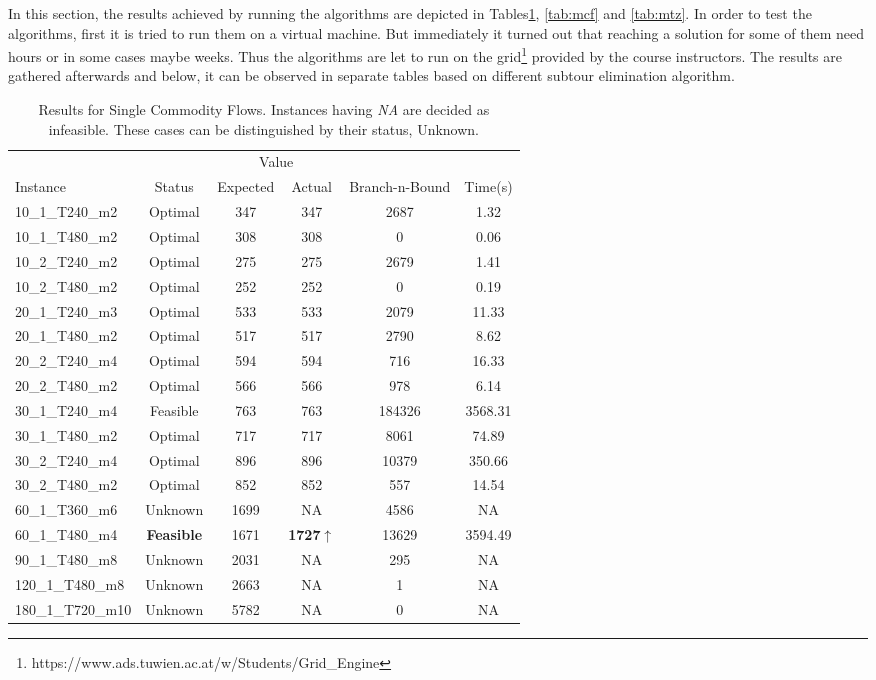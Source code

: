 In this section, the results achieved by running the algorithms are depicted in
Tables\ref{tab:scf}, \ref{tab:mcf} and \ref{tab:mtz}.
In order to test the algorithms, first it is tried to run them on a virtual
machine. But immediately it turned out that reaching a solution for some of them
need hours or in some cases maybe weeks. Thus the algorithms are let to run
on the grid\footnote{https://www.ads.tuwien.ac.at/w/Students/Grid\_Engine}
provided by the course instructors. The results are gathered afterwards and
below, it can be observed in separate tables based on different subtour
elimination algorithm.

\begin{center}

\begin{center}

\begin{table}[H]
    \begin{tabular}{ l c c c c c }
    \hline
    &&\multicolumn{2}{c}{Value} && \\
    \cmidrule(r){3-4}
    Instance & Status & Expected & Actual & Branch-n-Bound & Time(s) \\ \hline
    10\_1\_T240\_m2 & Optimal & 347& 347  & 2687 & 1.32 \\ 
	10\_1\_T480\_m2 & Optimal & 308& 308  & 0 & 0.06 \\ 
	10\_2\_T240\_m2 & Optimal & 275& 275  & 2679 & 1.41 \\ 
	10\_2\_T480\_m2 & Optimal & 252& 252  & 0 & 0.19 \\ 
	20\_1\_T240\_m3 & Optimal & 533& 533  & 2079 & 11.33 \\ 
	20\_1\_T480\_m2 & Optimal & 517& 517  & 2790 & 8.62 \\ 
	20\_2\_T240\_m4 & Optimal & 594& 594  & 716 & 16.33 \\ 
	20\_2\_T480\_m2 & Optimal & 566& 566  & 978 & 6.14 \\ 
	30\_1\_T240\_m4 & Feasible & 763& 763  & 184326 & 3568.31 \\ 
	30\_1\_T480\_m2 & Optimal & 717& 717  & 8061 & 74.89 \\ 
	30\_2\_T240\_m4 & Optimal & 896& 896  & 10379 & 350.66 \\ 
	30\_2\_T480\_m2 & Optimal & 852& 852  & 557 & 14.54 \\ 
	60\_1\_T360\_m6 & Unknown & 1699& NA &  4586 & NA \\ 
	60\_1\_T480\_m4 & {\bf Feasible} & 1671& {\bf 1727}$\uparrow$  & 13629 &
	3594.49
	\\
	90\_1\_T480\_m8 & Unknown & 2031& NA &  295 & NA \\ 
	120\_1\_T480\_m8 & Unknown & 2663& NA & 1 & NA \\ 
	180\_1\_T720\_m10 & Unknown & 5782& NA & 0 & NA \\
    \hline
    \end{tabular}
    \caption{\label{tab:scf} Results for Single Commodity Flows. Instances
    having {\it NA} are decided as infeasible. These cases can be
    distinguished by their status, Unknown.
    }
\end{table}


\end{center}
\end{center}
